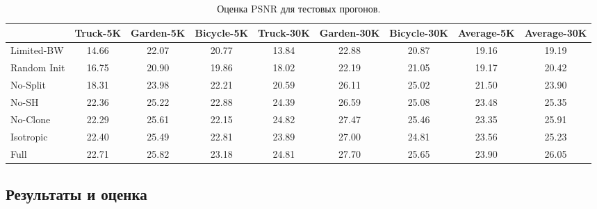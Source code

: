 \begin{table}[!h]
    \caption{Оценка PSNR для тестовых прогонов. }
    \centering
    \begin{tabular}{l|ccc|ccc|cc}
        ~ & Truck-5K & Garden-5K & Bicycle-5K & Truck-30K & Garden-30K & Bicycle-30K & Average-5K & Average-30K \\ \hline
        Limited-BW  & 14.66 & 22.07 & 20.77 & 13.84 & 22.88 & 20.87 & 19.16 & 19.19 \\
        Random Init & 16.75 & 20.90 & 19.86 & 18.02 & 22.19 & 21.05 & 19.17 & 20.42 \\ 
        No-Split    & 18.31 & 23.98 & 22.21 & 20.59 & 26.11 & 25.02 & 21.50 & 23.90 \\ 
        No-SH       & \cellcolor{yellow!40}22.36 & 25.22 & \cellcolor{orange!40}22.88 & \cellcolor{yellow!40}24.39 & 26.59 & \cellcolor{yellow!40}25.08 & \cellcolor{yellow!40}23.48 & \cellcolor{yellow!40}25.35 \\ 
        No-Clone    & 22.29 & \cellcolor{orange!40}25.61 & 22.15 & \cellcolor{red!40}24.82 & \cellcolor{orange!40}27.47 & \cellcolor{orange!40}25.46 & 23.35 & \cellcolor{orange!40}25.91 \\  
        Isotropic   & \cellcolor{orange!40}22.40 & \cellcolor{yellow!40}25.49 & \cellcolor{yellow!40}22.81 & 23.89 & \cellcolor{yellow!40}27.00 & 24.81 & \cellcolor{orange!40}23.56 & 25.23 \\  
        Full        & \cellcolor{red!40}22.71 & \cellcolor{red!40}25.82 & \cellcolor{red!40}23.18 & \cellcolor{orange!40}24.81 &\cellcolor{red!40} 27.70 & \cellcolor{red!40}25.65 & \cellcolor{red!40}23.90 & \cellcolor{red!40}26.05 \\  
    \end{tabular}
    \label{tab:ablation_table}
\end{table}

\subsection{Результаты и оценка}
